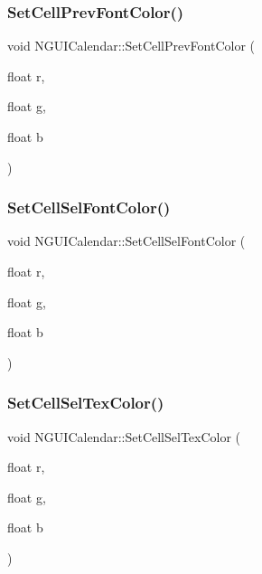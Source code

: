 \hypertarget{class_n_g_u_i_calendar_a70eed7a5a854b5c61c71934a0d2c79ed}{}\label{class_n_g_u_i_calendar_a70eed7a5a854b5c61c71934a0d2c79ed} 
\subsubsection{\texorpdfstring{Set\+Cell\+Prev\+Font\+Color()}{SetCellPrevFontColor()}}
{\footnotesize\ttfamily void N\+G\+U\+I\+Calendar\+::\+Set\+Cell\+Prev\+Font\+Color (\begin{DoxyParamCaption}\item[{float}]{r,  }\item[{float}]{g,  }\item[{float}]{b }\end{DoxyParamCaption})}

\hypertarget{class_n_g_u_i_calendar_a8c3d461f7bfbb7ced483cc789f91e30f}{}\label{class_n_g_u_i_calendar_a8c3d461f7bfbb7ced483cc789f91e30f} 
\subsubsection{\texorpdfstring{Set\+Cell\+Sel\+Font\+Color()}{SetCellSelFontColor()}}
{\footnotesize\ttfamily void N\+G\+U\+I\+Calendar\+::\+Set\+Cell\+Sel\+Font\+Color (\begin{DoxyParamCaption}\item[{float}]{r,  }\item[{float}]{g,  }\item[{float}]{b }\end{DoxyParamCaption})}

\hypertarget{class_n_g_u_i_calendar_aac884137383e7c237598f717851c608d}{}\label{class_n_g_u_i_calendar_aac884137383e7c237598f717851c608d} 
\subsubsection{\texorpdfstring{Set\+Cell\+Sel\+Tex\+Color()}{SetCellSelTexColor()}}
{\footnotesize\ttfamily void N\+G\+U\+I\+Calendar\+::\+Set\+Cell\+Sel\+Tex\+Color (\begin{DoxyParamCaption}\item[{float}]{r,  }\item[{float}]{g,  }\item[{float}]{b }\end{DoxyParamCaption})}


